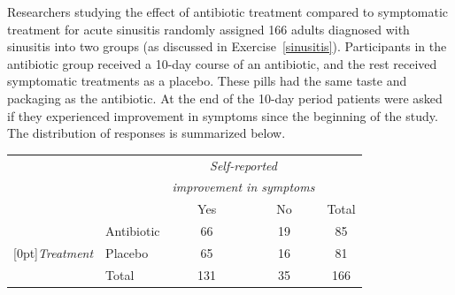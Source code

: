Researchers studying the effect of antibiotic treatment compared to symptomatic treatment for acute sinusitis randomly assigned 166 adults diagnosed with sinusitis into two groups (as discussed in Exercise~\ref{sinusitis}). Participants in the antibiotic group received a 10-day course of an antibiotic, and the rest received symptomatic treatments as a placebo. These pills had the same taste and packaging as the antibiotic. At the end of the 10-day period patients were asked if they experienced improvement in symptoms since the beginning of the study. The distribution of responses is summarized below. 
\begin{center}
\begin{tabular}{ll  cc c} 
			&				& \multicolumn{2}{c}{\textit{Self-reported}} \\
			&				& \multicolumn{2}{c}{\textit{improvement in symptoms}} \\
\cline{3-4}
			&							& Yes 	& No 	& Total	\\
\cline{2-5}
							&Antibiotic 	& 66	 	& 19		& 85 	\\
\raisebox{1.5ex}[0pt]{\textit{Treatment}}	& Placebo		& 65	 	& 16 	 	& 81 \\
\cline{2-5}
							&Total		& 131	& 35		& 166
\end{tabular}
\end{center}
